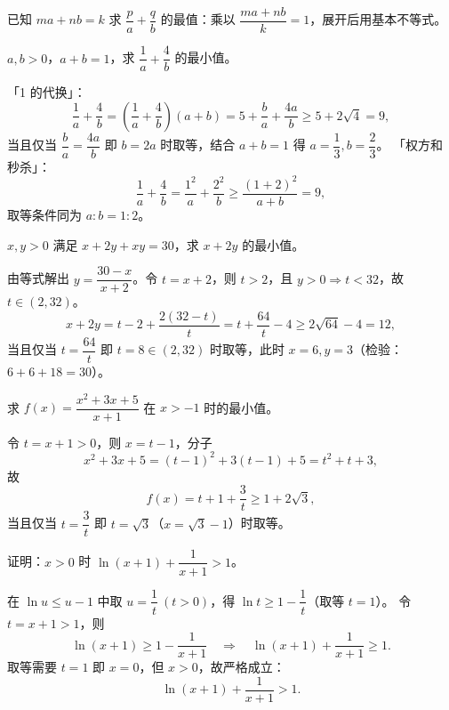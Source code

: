 \begin{explore}
已知 $ma+nb=k$ 求 $\dfrac pa+\dfrac qb$ 的最值：乘以 $\dfrac{ma+nb}k=1$，展开后用基本不等式。

\begin{example}
$a,b>0$，$a+b=1$，求 $\dfrac1a+\dfrac4b$ 的最小值。
\end{example}
\begin{solution}
「1 的代换」：
\[
  \frac1a+\frac4b=\left(\frac1a+\frac4b\right)(a+b)
  =5+\frac ba+\frac{4a}b\ge5+2\sqrt4=9,
\]
当且仅当 $\dfrac ba=\dfrac{4a}b$ 即 $b=2a$ 时取等，结合 $a+b=1$ 得 $a=\dfrac13,b=\dfrac23$。
「权方和秒杀」：
\[
  \frac1a+\frac4b=\frac{1^2}{a}+\frac{2^2}{b}\ge\frac{(1+2)^2}{a+b}=9,
\]
取等条件同为 $a:b=1:2$。
\end{solution}


\begin{example}
$x,y>0$ 满足 $x+2y+xy=30$，求 $x+2y$ 的最小值。
\end{example}
\begin{solution}
由等式解出 $y=\dfrac{30-x}{x+2}$。令 $t=x+2$，则 $t>2$，且 $y>0\Rightarrow t<32$，故 $t\in(2,32)$。
\[
  x+2y=t-2+\frac{2(32-t)}t=t+\frac{64}t-4\ge2\sqrt{64}-4=12,
\]
当且仅当 $t=\dfrac{64}t$ 即 $t=8\in(2,32)$ 时取等，此时 $x=6,y=3$（检验：$6+6+18=30$）。
\end{solution}


\begin{example}
求 $f(x)=\dfrac{x^2+3x+5}{x+1}$ 在 $x>-1$ 时的最小值。
\end{example}
\begin{solution}
令 $t=x+1>0$，则 $x=t-1$，分子
\[
  x^2+3x+5=(t-1)^2+3(t-1)+5=t^2+t+3,
\]
故
\[
  f(x)=t+1+\frac3t\ge1+2\sqrt3,
\]
当且仅当 $t=\dfrac3t$ 即 $t=\sqrt3$（$x=\sqrt3-1$）时取等。
\end{solution}


\begin{example}
证明：$x>0$ 时 $\ln(x+1)+\dfrac1{x+1}>1$。
\end{example}
\begin{solution}
在 $\ln u\le u-1$ 中取 $u=\dfrac1t\ (t>0)$，得 $\ln t\ge1-\dfrac1t$（取等 $t=1$）。
令 $t=x+1>1$，则
\[
  \ln(x+1)\ge1-\frac1{x+1}\quad\Longrightarrow\quad
  \ln(x+1)+\frac1{x+1}\ge1 .
\]
取等需要 $t=1$ 即 $x=0$，但 $x>0$，故严格成立：
\[
  \ln(x+1)+\frac1{x+1}>1 .
\]
\end{solution}


\end{explore}
